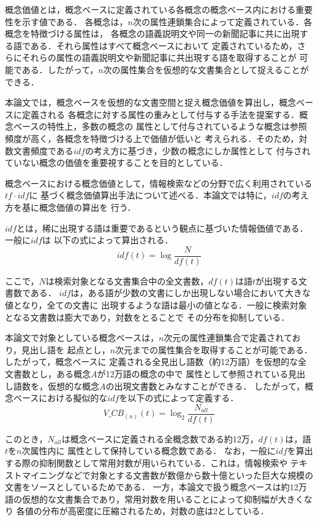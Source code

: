 \documentclass[japanese]{jnlp_1.3e}
\begin{document}
概念価値とは，概念ベースに定義されている各概念の概念ベース内における重要性を示す値である．
各概念は，$n$次の属性連鎖集合によって定義されている．各概念を特徴づける属性は，
各概念の語義説明文や同一の新聞記事に共に出現する語である．それら属性はすべて概念ベースにおいて
定義されているため，さらにそれらの属性の語義説明文や新聞記事に共出現する語を取得することが
可能である．したがって，$n$次の属性集合を仮想的な文書集合として捉えることができる．

本論文では，概念ベースを仮想的な文書空間と捉え概念価値を算出し，概念ベースに定義される
各概念に対する属性の重みとして付与する手法を提案する．概念ベースの特性上，多数の概念の
属性として付与されているような概念は参照頻度が高く，各概念を特徴づける上で価値が低いと
考えられる．そのため，対数文書頻度である$\mathit{idf}$の考え方に基づき，少数の概念にしか属性として
付与されていない概念の価値を重要視することを目的としている．


概念ベースにおける概念価値として，情報検索などの分野で広く利用されている$\mathit{tf}\cdot\mathit{idf}$に
基づく概念価値算出手法について述べる．本論文では特に，$\mathit{idf}$の考え方を基に概念価値の算出を
行う．

$\mathit{idf}$とは，稀に出現する語は重要であるという観点に基づいた情報価値である．一般に$\mathit{idf}$は
以下の式によって算出される．
\begin{equation}
 \mathit{idf}(t)=\log \frac{N}{\mathit{df}(t)}
\end{equation}

ここで，$N$は検索対象となる文書集合中の全文書数，$\mathit{df}(t)$は語$t$が出現する文書数である．
$\mathit{idf}$は，ある語が少数の文書にしか出現しない場合において大きな値となり，全ての文書に
出現するような語は最小の値となる．一般に検索対象となる文書数は膨大であり，対数をとることで
その分布を抑制している．

本論文で対象としている概念ベースは，$n$次元の属性連鎖集合で定義されており，見出し語を
起点とし，$n$次元までの属性集合を取得することが可能である．したがって，概念ベースに
定義される全見出し語数（約12万語）を仮想的な全文書数とし，ある概念$A$が12万語の概念の中で
属性として参照されている見出し語数を，仮想的な概念$A$の出現文書数とみなすことができる．
したがって，概念ベースにおける擬似的な$\mathit{idf}$を以下の式によって定義する．
\begin{equation}
 V\_ \mathit{CB}_{(n)}(t)=\log_2\frac{N_{\mathit{all}}}{\mathit{df}(t)} \label{idf-base}
\end{equation}

このとき，$N_{\mathit{all}}$は概念ベースに定義される全概念数である約12万，$\mathit{df}(t)$は，語$t$を$n$次属性内に
属性として保持している概念数である．
なお，一般に$\mathit{idf}$を算出する際の抑制関数として常用対数が用いられている．これは，情報検索や
テキストマイニングなどで対象とする文書数が数億から数十億といった巨大な規模の文書をソースとしているためである．
一方，本論文で扱う概念ベースは約12万語の仮想的な文書集合であり，常用対数を用いることによって抑制幅が大きくなり
各値の分布が高密度に圧縮されるため，対数の底は2としている．
\end{document}
